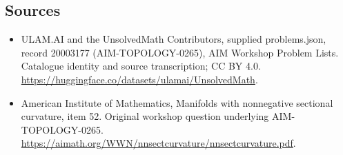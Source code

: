 \documentclass[11pt,a4paper]{article}
\begin{document}
\subsection{Sources}
\begin{itemize}
\item[S1] ULAM.AI and the UnsolvedMath Contributors, supplied problems.json, record 20003177 (AIM-TOPOLOGY-0265), AIM Workshop Problem Lists. Catalogue identity and source transcription; CC BY 4.0.
\url{https://huggingface.co/datasets/ulamai/UnsolvedMath}.
\item[S2] American Institute of Mathematics, Manifolds with nonnegative sectional curvature, item 52. Original workshop question underlying AIM-TOPOLOGY-0265.
\url{https://aimath.org/WWN/nnsectcurvature/nnsectcurvature.pdf}.
\end{itemize}
\end{document}
